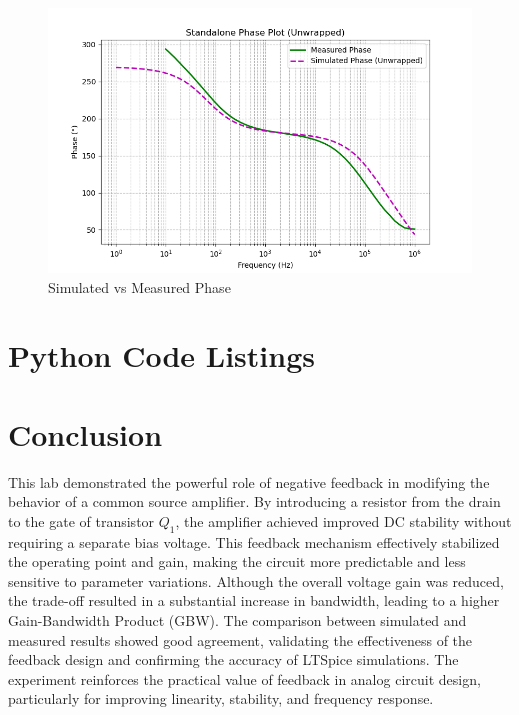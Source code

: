 \begin{figure}[H]
	\centering
	\includegraphics[width=1.0\linewidth]{Chapter_5/Lab_05_Phase_vs.png}
	\caption{Simulated vs Measured Phase}
	\label{Ch5_fig:5}
\end{figure}


\section{Python Code Listings}



\section{Conclusion}
This lab demonstrated the powerful role of negative feedback in modifying the behavior of a common source amplifier. By introducing a resistor from the drain to the gate of transistor $Q_1$​, the amplifier achieved improved DC stability without requiring a separate bias voltage. This feedback mechanism effectively stabilized the operating point and gain, making the circuit more predictable and less sensitive to parameter variations. Although the overall voltage gain was reduced, the trade-off resulted in a substantial increase in bandwidth, leading to a higher Gain-Bandwidth Product (GBW). The comparison between simulated and measured results showed good agreement, validating the effectiveness of the feedback design and confirming the accuracy of LTSpice simulations. The experiment reinforces the practical value of feedback in analog circuit design, particularly for improving linearity, stability, and frequency response.